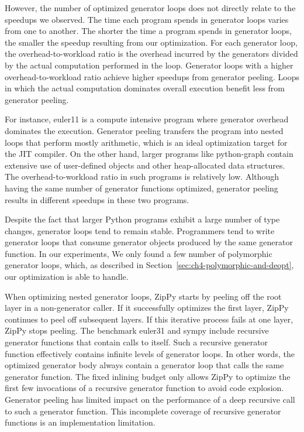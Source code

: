 However, the number of optimized generator loops does not directly relate to the speedups we observed.
The time each program spends in generator loops varies from one to another.
The shorter the time a program spends in generator loops, the smaller the speedup resulting from our optimization.
For each generator loop, the overhead-to-workload ratio is the overhead incurred by the generators divided by the actual computation performed in the loop.
Generator loops with a higher overhead-to-workload ratio achieve higher speedups from generator peeling.
Loops in which the actual computation dominates overall execution benefit less from generator peeling.

For instance, \textsf{euler11} is a compute intensive program where generator overhead dominates the execution.
Generator peeling transfers the program into nested loops that perform mostly arithmetic, which is an ideal optimization target for the JIT compiler.
On the other hand, larger programs like \textsf{python-graph} contain extensive use of user-defined objects and other heap-allocated data structures.
The overhead-to-workload ratio in such programs is relatively low.
Although having the same number of generator functions optimized, generator peeling results in different speedups in these two programs.

Despite the fact that larger Python programs exhibit a large number of type changes, generator loops tend to remain stable.
Programmers tend to write generator loops that consume generator objects produced by the same generator function.
In our experiments, We only found a few number of polymorphic generator loops, which, as described in Section~\ref{sec:ch4-polymorphic-and-deopt}, our optimization is able to handle.

When optimizing nested generator loops, ZipPy starts by peeling off the root layer in a non-generator caller.
If it successfully optimizes the first layer, ZipPy continues to peel off subsequent layers.
If this iterative process fails at one layer, ZipPy stops peeling.
The benchmark \textsf{euler31} and \textsf{sympy} include recursive generator functions that contain calls to itself.
Such a recursive generator function effectively contains infinite levels of generator loops.
In other words, the optimized generator body always contain a generator loop that calls the same generator function.
The fixed inlining budget only allows ZipPy to optimize the first few invocations of a recursive generator function to avoid code explosion.
Generator peeling has limited impact on the performance of a deep recursive call to such a generator function.
This incomplete coverage of recursive generator functions is an implementation limitation.

